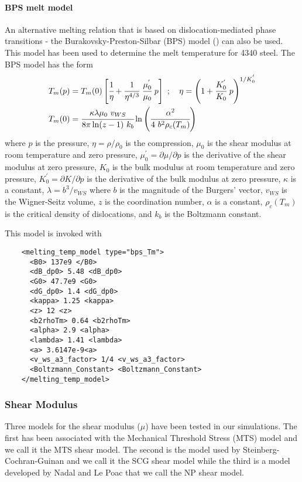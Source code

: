   \paragraph{BPS melt model}
  An alternative melting relation that is based on dislocation-mediated
  phase transitions - the Burakovsky-Preston-Silbar (BPS) model
  (\cite{Burakovsky00}) can also be used.  This model has been used to 
  determine the melt temperature for 4340 steel.  The BPS model has the form
  \begin{align}
    T_m(p) & = T_m(0)
      \left[\cfrac{1}{\eta} + 
            \cfrac{1}{\eta^{4/3}}~\cfrac{\mu_0^{'}}{\mu_0}~p\right]~; 
    \quad
    \eta = \left(1 + \cfrac{K_0^{'}}{K_0}~p\right)^{1/K_0^{'}} 
    \label{eq:TmBPS}\\
    T_m(0) & = \cfrac{\kappa\lambda\mu_0~v_{WS}}{8\pi\ln(z-1)~k_b}
               \ln\left(\cfrac{\alpha^2}{4~b^2\rho_c(T_m)}\right)
  \end{align}
  where $p$ is the pressure, $\eta = \rho/\rho_0$ is the compression, 
  $\mu_0$ is the shear modulus at room temperature and zero pressure, 
  $\mu_0^{'} = \partial\mu/\partial p$ is the derivative of the shear modulus 
  at zero pressure, $K_0$ is the bulk modulus at room temperature and
  zero pressure, $K_0^{'} = \partial K/\partial p$ is the derivative of the 
  bulk modulus at zero pressure, $\kappa$ is a constant, $\lambda = b^3/v_{WS}$
  where $b$ is the magnitude of the Burgers' vector, $v_{WS}$ is the 
  Wigner-Seitz volume, $z$ is the coordination number, $\alpha$ is a 
  constant, $\rho_c(T_m)$ is the critical density of dislocations, and
  $k_b$ is the Boltzmann constant.

  This model is invoked with
  \begin{verbatim}
    <melting_temp_model type="bps_Tm">
      <B0> 137e9 </B0>
      <dB_dp0> 5.48 <dB_dp0>
      <G0> 47.7e9 <G0>
      <dG_dp0> 1.4 <dG_dp0>
      <kappa> 1.25 <kappa>
      <z> 12 <z>
      <b2rhoTm> 0.64 <b2rhoTm>
      <alpha> 2.9 <alpha>
      <lambda> 1.41 <lambda>
      <a> 3.6147e-9<a>
      <v_ws_a3_factor> 1/4 <v_ws_a3_factor>
      <Boltzmann_Constant> <Boltzmann_Constant>
    </melting_temp_model>
  \end{verbatim}

  \subsubsection{Shear Modulus} \label{sec:ModelShear}
  Three models for the shear modulus ($\mu$) have been tested in our 
  simulations.  The first has been associated with the Mechanical 
  Threshold Stress (MTS) model and we call it the MTS shear model.
  The second is the model used by Steinberg-Cochran-Guinan and we call
  it the SCG shear model while the third is a model developed by 
  Nadal and Le Poac that we call the NP shear model.

